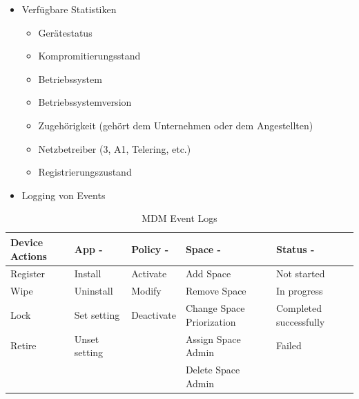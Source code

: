 \begin{itemize}
\begin{itemize}
		\item Verfügbare Statistiken 
		\begin{itemize}
			\item Gerätestatus
			\item Kompromitierungsstand
			\item Betriebssystem
			\item Betriebssystemversion
			\item Zugehörigkeit (gehört dem Unternehmen oder dem Angestellten)
			\item Netzbetreiber (3, A1, Telering, etc.)
			\item Registrierungszustand 
		\end{itemize}
		\item Logging von Events
	\end{itemize}
\end{itemize}	

\begin{table}[h]
\centering
\begin{tabular}{|l|l|l|l|l|}
\hline
\textbf{Device Actions} & \textbf{App -} & \textbf{Policy -} & \textbf{Space -}          & \textbf{Status -}      \\ \hline
Register                & Install        & Activate          & Add Space                 & Not started            \\ \hline
Wipe                    & Uninstall      & Modify            & Remove Space              & In progress            \\ \hline
Lock                    & Set setting    & Deactivate        & Change Space Priorization & Completed successfully \\ \hline
Retire                  & Unset setting  &                   & Assign Space Admin        & Failed                 \\ \hline
                        &                &                   & Delete Space Admin        &                        \\ \hline
\end{tabular}
\caption{MDM Event Logs}
\end{table}

